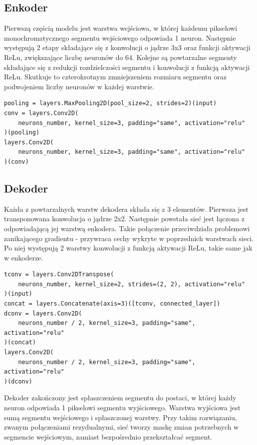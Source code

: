 \documentclass[a4paper, 12pt]{article}
\begin{document}
\subsection{Enkoder}
Pierwszą częścią modelu jest warstwa wejściowa, w której każdemu pikselowi monochromatycznego segmentu wejściowego odpowiada 1 neuron.
Następnie występują 2 etapy składające się z konwolucji o jądrze 3x3 oraz funkcji aktywacji ReLu, zwiększające liczbę neuronów do 64.
Kolejne są powtarzalne segmenty składające się z redukcji rozdzielczości segmentu i konwolucji z funkcją aktywacji ReLu.
Skutkuje to czterokrotnym zmniejszeniem rozmiaru segmentu oraz podwojeniem liczby neuronów w każdej warstwie.
\lstset{language=Python}
\lstset{frame=lines}
\lstset{basicstyle=\footnotesize}
\begin{lstlisting}
pooling = layers.MaxPooling2D(pool_size=2, strides=2)(input)
conv = layers.Conv2D(
    neurons_number, kernel_size=3, padding="same", activation="relu"
)(pooling)
layers.Conv2D(
    neurons_number, kernel_size=3, padding="same", activation="relu"
)(conv)
\end{lstlisting}
\newpage

\subsection{Dekoder}
Każda z powtarzalnych warstw dekodera składa się z 3 elementów.
Pierwsza jest transponowana konwolucja o jądrze 2x2. Następnie powstała sieć jest łączona z odpowiadającą jej warstwą enkodera.
Takie połączenie przeciwdziała problemowi zanikającego gradientu - przywraca cechy wykryte w poprzednich warstwach sieci.
Po niej występują 2 warstwy konwolucji z funkcją aktywacji ReLu, takie same jak w enkoderze.
\lstset{language=Python}
\lstset{frame=lines}
\lstset{basicstyle=\footnotesize}
\begin{lstlisting}
tconv = layers.Conv2DTranspose(
    neurons_number, kernel_size=2, strides=(2, 2), activation="relu"
)(input)
concat = layers.Concatenate(axis=3)([tconv, connected_layer])
dconv = layers.Conv2D(
    neurons_number / 2, kernel_size=3, padding="same", activation="relu"
)(concat)
layers.Conv2D(
    neurons_number / 2, kernel_size=3, padding="same", activation="relu"
)(dconv)
\end{lstlisting}

Dekoder zakończony jest spłaszczeniem segmentu do postaci, w której każdy neuron odpowiada 1 pikselowi segmentu wyjściowego.
Warstwa wyjściowa jest sumą segmentu wejściowego i spłaszczonej warstwy.
Przy takim rozwiązaniu, zwanym połączeniami rezydualnymi, sieć tworzy maskę zmian potrzebnych w segmencie wejściowym,
zamiast bezpośrednio przekształcać segment. \cite{he2015deep}
\end{document}
